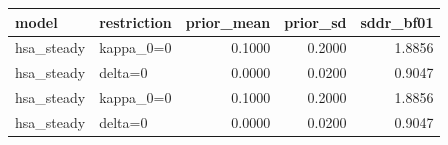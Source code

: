 \begin{tabular}{llrrr}
\toprule
model & restriction & prior\_mean & prior\_sd & sddr\_bf01 \\
\midrule
hsa\_steady & kappa\_0=0 & 0.1000 & 0.2000 & 1.8856 \\
hsa\_steady & delta=0 & 0.0000 & 0.0200 & 0.9047 \\
hsa\_steady & kappa\_0=0 & 0.1000 & 0.2000 & 1.8856 \\
hsa\_steady & delta=0 & 0.0000 & 0.0200 & 0.9047 \\
\bottomrule
\end{tabular}
